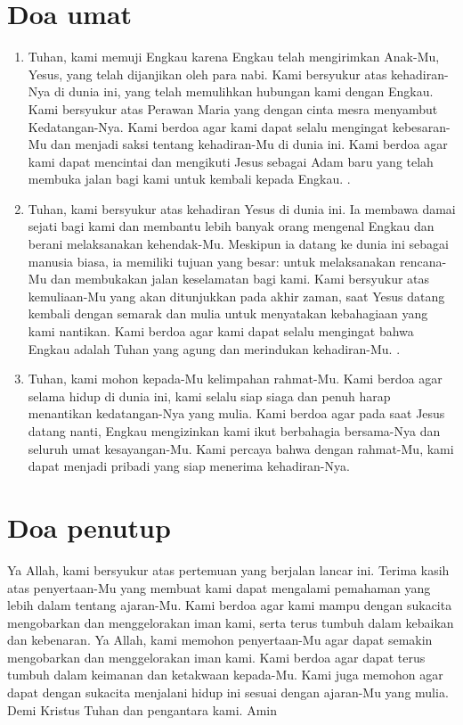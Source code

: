 \documentclass[11pt,a5paper]{article}
\begin{document}
\section*{Doa umat}
\begin{enumerate}
	\item Tuhan, kami memuji Engkau karena Engkau telah mengirimkan Anak-Mu, Yesus, yang telah dijanjikan oleh para nabi. Kami bersyukur atas kehadiran-Nya di dunia ini, yang telah memulihkan hubungan kami dengan Engkau. Kami bersyukur atas Perawan Maria yang dengan cinta mesra menyambut Kedatangan-Nya. Kami berdoa agar kami dapat selalu mengingat kebesaran-Mu dan menjadi saksi tentang kehadiran-Mu di dunia ini. Kami berdoa agar kami dapat mencintai dan mengikuti Jesus sebagai Adam baru yang telah membuka jalan bagi kami untuk kembali kepada Engkau. . 

\item Tuhan, kami bersyukur atas kehadiran Yesus di dunia ini. Ia membawa damai sejati bagi kami dan membantu lebih banyak orang mengenal Engkau dan berani melaksanakan kehendak-Mu. Meskipun ia datang ke dunia ini sebagai manusia biasa, ia memiliki tujuan yang besar: untuk melaksanakan rencana-Mu dan membukakan jalan keselamatan bagi kami. Kami bersyukur atas kemuliaan-Mu yang akan ditunjukkan pada akhir zaman, saat Yesus datang kembali dengan semarak dan mulia untuk menyatakan kebahagiaan yang kami nantikan. Kami berdoa agar kami dapat selalu mengingat bahwa Engkau adalah Tuhan yang agung dan merindukan kehadiran-Mu. .

\item Tuhan, kami mohon kepada-Mu kelimpahan rahmat-Mu. Kami berdoa agar selama hidup di dunia ini, kami selalu siap siaga dan penuh harap menantikan kedatangan-Nya yang mulia. Kami berdoa agar pada saat Jesus datang nanti, Engkau mengizinkan kami ikut berbahagia bersama-Nya dan seluruh umat kesayangan-Mu. Kami percaya bahwa dengan rahmat-Mu, kami dapat menjadi pribadi yang siap menerima kehadiran-Nya. 

\end{enumerate}

\section*{Doa penutup}
Ya Allah, kami bersyukur atas pertemuan yang berjalan lancar ini. Terima kasih atas penyertaan-Mu yang membuat kami dapat mengalami pemahaman yang lebih dalam tentang ajaran-Mu. Kami berdoa agar kami mampu dengan sukacita mengobarkan dan menggelorakan iman kami, serta terus tumbuh dalam kebaikan dan kebenaran.
Ya Allah, kami memohon penyertaan-Mu agar dapat semakin mengobarkan dan menggelorakan iman kami. Kami berdoa agar dapat terus tumbuh dalam keimanan dan ketakwaan kepada-Mu. Kami juga memohon agar dapat dengan sukacita menjalani hidup ini sesuai dengan ajaran-Mu yang mulia.  Demi Kristus Tuhan dan pengantara kami. Amin
\end{document}
